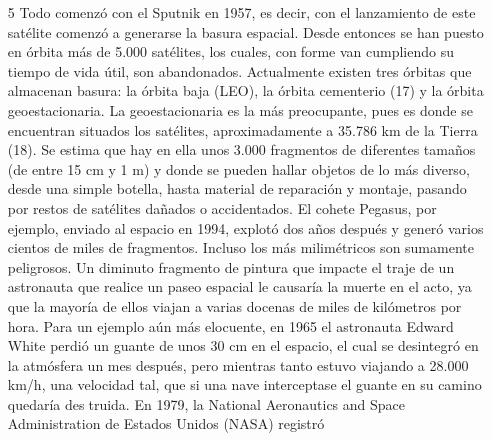 \documentclass[12pt,letterpaper]{article}
\begin{document}
\begin{multicols}{2}
\begin{itemize}
    \item [5]Todo comenzó con el Sputnik en 1957, es decir, con el lanzamiento de este satélite comenzó a generarse la basura espacial. Desde entonces se han puesto en órbita más de 5.000 satélites, los cuales, conforme van cumpliendo su tiempo de vida útil, son abandonados. Actualmente existen tres órbitas que almacenan basura: la órbita baja (LEO), la órbita cementerio (17) y la órbita geoestacionaria. La geoestacionaria es la más preocupante, pues es donde se encuentran situados los satélites, aproximadamente a 35.786 km de la Tierra (18). Se estima que hay en ella unos 3.000 fragmentos de diferentes tamaños (de entre 15 cm y 1 m) y donde se pueden hallar objetos de lo más diverso, desde una simple botella, hasta material de reparación y montaje, pasando por restos de satélites dañados o accidentados. El cohete Pegasus, por ejemplo, enviado al espacio en 1994, explotó dos años después y generó varios cientos de miles de fragmentos. Incluso los más milimétricos son sumamente peligrosos. Un diminuto fragmento de pintura que impacte el traje de un astronauta que realice un paseo espacial le causaría la muerte en el acto, ya que la mayoría de ellos viajan a varias docenas de miles de kilómetros por hora. Para un ejemplo aún más elocuente, en 1965 el astronauta Edward White perdió un guante de unos 30 cm en el espacio, el cual se desintegró en la atmósfera un mes después, pero mientras tanto estuvo viajando a 28.000 km/h, una velocidad tal, que si una nave interceptase el guante en su camino quedaría destruida. En 1979, la National Aeronautics and Space Administration de Estados Unidos (NASA) registró 
\end{itemize}
\end{multicols}
\newpage
\end{document}
